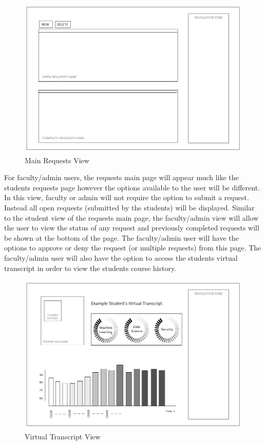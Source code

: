 \begin{figure}
	\includegraphics[width=\linewidth]{requests_main.png}
	\caption{Main Requests View}
	\label{fig:fig1}
\end{figure}

For faculty/admin users, the requests main page will appear much like the students requests page however the options available to the user will be different. In this view, faculty or admin will not require the option to submit a request. Instead all open requests (submitted by the students) will be displayed. Similar to the student view of the requests main page, the faculty/admin view will allow the user to view the status of any request and previously completed requests will be shown at the bottom of the page. The faculty/admin user will have the options to approve or deny the request (or multiple requests) from this page. The faculty/admin user will also have the option to access the students virtual transcript in order to view the students course history.

\begin{figure}
	\includegraphics[width=\linewidth]{virtual_transcript.png}
	\caption{Virtual Transcript View}
	\label{fig:fig1}
\end{figure}

